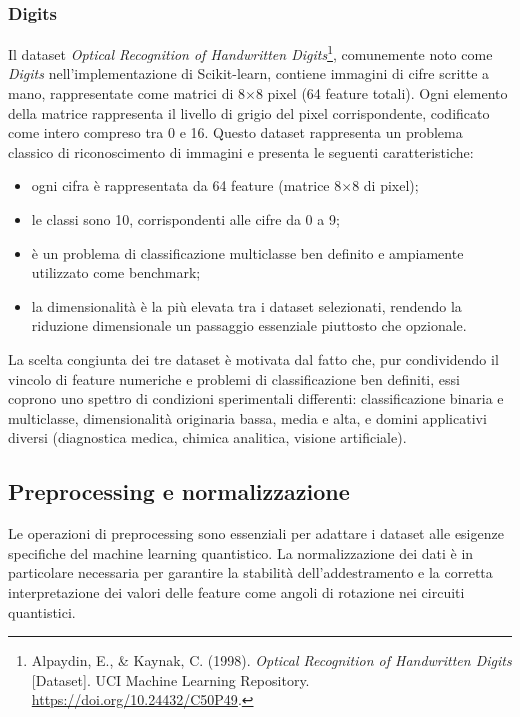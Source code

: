\subsubsection{Digits}
Il dataset \textit{Optical Recognition of Handwritten Digits}\footnote{Alpaydin, E., \& Kaynak, C. (1998). \textit{Optical Recognition of Handwritten Digits} [Dataset]. UCI Machine Learning Repository. \url{https://doi.org/10.24432/C50P49}.}, comunemente noto come \textit{Digits} nell'implementazione di Scikit-learn, contiene immagini di cifre scritte a mano, rappresentate come matrici di 8$\times$8 pixel (64 feature totali). Ogni elemento della matrice rappresenta il livello di grigio del pixel corrispondente, codificato come intero compreso tra 0 e 16. Questo dataset rappresenta un problema classico di riconoscimento di immagini e presenta le seguenti caratteristiche:
\begin{itemize}
    \item ogni cifra è rappresentata da 64 feature (matrice 8$\times$8 di pixel);
    \item le classi sono 10, corrispondenti alle cifre da 0 a 9;
    \item è un problema di classificazione multiclasse ben definito e ampiamente utilizzato come benchmark;
    \item la dimensionalità è la più elevata tra i dataset selezionati, rendendo la riduzione dimensionale un passaggio essenziale piuttosto che opzionale.
\end{itemize}

La scelta congiunta dei tre dataset è motivata dal fatto che, pur condividendo il vincolo di feature numeriche e problemi di classificazione ben definiti, essi coprono uno spettro di condizioni sperimentali differenti: classificazione binaria e multiclasse, dimensionalità originaria bassa, media e alta, e domini applicativi diversi (diagnostica medica, chimica analitica, visione artificiale).

\subsection{Preprocessing e normalizzazione}
Le operazioni di preprocessing sono essenziali per adattare i dataset alle esigenze specifiche del machine learning quantistico. La normalizzazione dei dati è in particolare necessaria per garantire la stabilità dell'addestramento e la corretta interpretazione dei valori delle feature come angoli di rotazione nei circuiti quantistici.

